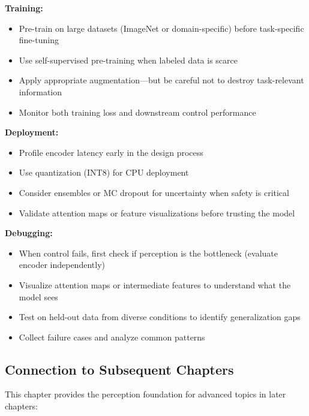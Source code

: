 \textbf{Training:}
\begin{itemize}
    \item Pre-train on large datasets (ImageNet or domain-specific) before task-specific fine-tuning
    \item Use self-supervised pre-training when labeled data is scarce
    \item Apply appropriate augmentation---but be careful not to destroy task-relevant information
    \item Monitor both training loss and downstream control performance
\end{itemize}

\textbf{Deployment:}
\begin{itemize}
    \item Profile encoder latency early in the design process
    \item Use quantization (INT8) for CPU deployment
    \item Consider ensembles or MC dropout for uncertainty when safety is critical
    \item Validate attention maps or feature visualizations before trusting the model
\end{itemize}

\textbf{Debugging:}
\begin{itemize}
    \item When control fails, first check if perception is the bottleneck (evaluate encoder independently)
    \item Visualize attention maps or intermediate features to understand what the model sees
    \item Test on held-out data from diverse conditions to identify generalization gaps
    \item Collect failure cases and analyze common patterns
\end{itemize}

\subsection{Connection to Subsequent Chapters}

This chapter provides the perception foundation for advanced topics in later chapters:

